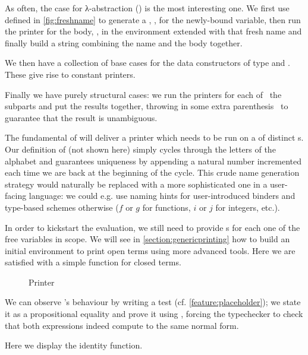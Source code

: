 As often, the case for λ-abstraction () is the most interesting one.
We first use  defined in \cref{fig:freshname} to generate a ,
, for the newly-bound variable, then run the printer for the body, ,
in the environment extended with that fresh name and finally build a string
combining the name and the body together.


We then have a collection of base cases for the data constructors of type
 and . These give rise to constant printers.


Finally we have purely structural cases: we run the printers for each of~
the subparts and put the results together, throwing in some extra parenthesis~
to guarantee that the result is unambiguous.



The fundamental  of  will deliver a printer which needs to be run
on a  of distinct s. Our definition of  (not
shown here) simply cycles through the letters of the alphabet and guarantees
uniqueness by appending a natural number incremented each time we are back at
the beginning of the cycle. This crude name generation strategy would naturally
be replaced with a more sophisticated one in a user-facing language: we could
e.g. use naming hints for user-introduced binders and type-based schemes otherwise
($f$ or $g$ for functions, $i$ or $j$ for integers, etc.).

In order to kickstart the evaluation, we still need to provide s for each
one of the free variables in scope. We will see in \cref{section:genericprinting}
how to build an initial environment to print open terms using more advanced tools.
Here we are satisfied with a simple  function for closed terms.

\begin{figure}[h]
\caption{Printer\label{fig:printer}}
\end{figure}

We can observe 's behaviour by writing a test
(cf. \cref{feature:placeholder}); we state it as a
propositional equality and prove it using , forcing the typechecker
to check that both expressions indeed compute to the same normal form.

\begin{example}
\label{fig:printtest}
Here we display the identity function.

\end{example}
